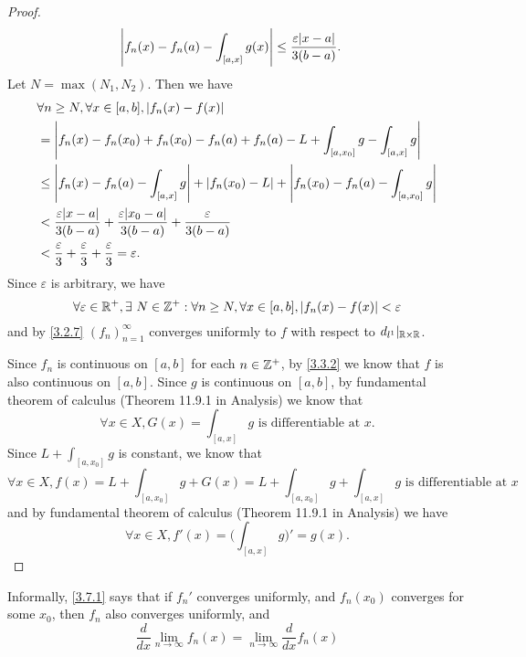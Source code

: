 \begin{proof}
\begin{align*}
             & \abs{f_n(x) - f_n(a) - \int_{[a, x]} g(x)} \leq \dfrac{\varepsilon \abs{x - a}}{3(b - a)}.
  \end{align*}
  Let \(N = \max(N_1, N_2)\).
  Then we have
  \begin{align*}
     & \forall n \geq N, \forall x \in [a, b], \abs{f_n(x) - f(x)}                                                               \\
     & = \abs{f_n(x) - f_n(x_0) + f_n(x_0) - f_n(a) + f_n(a) - L + \int_{[a, x_0]} g - \int_{[a, x]} g}                          \\
     & \leq \abs{f_n(x) - f_n(a) - \int_{[a, x]} g} + \abs{f_n(x_0) - L} + \abs{f_n(x_0) - f_n(a) - \int_{[a, x_0]} g}           \\
     & < \dfrac{\varepsilon \abs{x - a}}{3(b - a)} + \dfrac{\varepsilon \abs{x_0 - a}}{3(b - a)} + \dfrac{\varepsilon}{3(b - a)} \\
     & < \dfrac{\varepsilon}{3} + \dfrac{\varepsilon}{3} + \dfrac{\varepsilon}{3} = \varepsilon.
  \end{align*}
  Since \(\varepsilon\) is arbitrary, we have
  \[
    \forall \varepsilon \in \mathbb{R}^+, \exists\ N \in \mathbb{Z}^+ : \forall n \geq N, \forall x \in [a, b], \left\lvert f_n(x) - f(x)\right\rvert < \varepsilon
  \]
  and by \cref{3.2.7} \((f_n)_{n = 1}^\infty\) converges uniformly to \(f\) with respect to \(d_{l^1}|_{\mathbb{R} \times \mathbb{R}}\).

  Since \(f_n\) is continuous on \([a, b]\) for each \(n \in \mathbb{Z}^+\), by \cref{3.3.2} we know that \(f\) is also continuous on \([a, b]\).
  Since \(g\) is continuous on \([a, b]\), by fundamental theorem of calculus (Theorem 11.9.1 in Analysis) we know that
  \[
    \forall x \in X, G(x) = \int_{[a, x]} g \text{ is differentiable at } x.
  \]
  Since \(L + \int_{[a, x_0]} g\) is constant, we know that
  \[
    \forall x \in X, f(x) = L + \int_{[a, x_0]} g + G(x) = L + \int_{[a, x_0]} g + \int_{[a, x]} g \text{ is differentiable at } x
  \]
  and by fundamental theorem of calculus (Theorem 11.9.1 in Analysis) we have
  \[
    \forall x \in X, f'(x) = \bigg(\int_{[a, x]} g\bigg)' = g(x).
  \]
\end{proof}

\begin{note}
  Informally, \cref{3.7.1} says that if \(f_n'\) converges uniformly, and \(f_n(x_0)\) converges for some \(x_0\), then \(f_n\) also converges uniformly, and
  \[
    \dfrac{d}{dx} \lim_{n \to \infty} f_n(x) = \lim_{n \to \infty} \dfrac{d}{dx} f_n(x)
  \]
\end{note}

